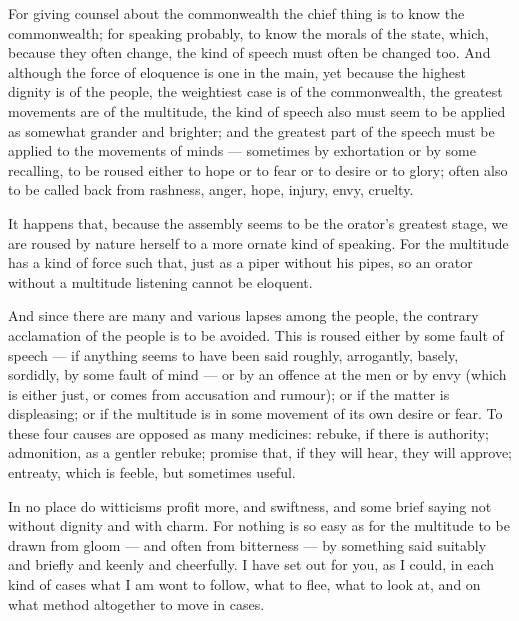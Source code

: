  For giving counsel about the commonwealth the chief thing is to know the commonwealth; for speaking probably, to know the morals of the state, which, because they often change, the kind of speech must often be changed too. And although the force of eloquence is one in the main, yet because the highest dignity is of the people, the weightiest case is of the commonwealth, the greatest movements are of the multitude, the kind of speech also must seem to be applied as somewhat grander and brighter; and the greatest part of the speech must be applied to the movements of minds — sometimes by exhortation or by some recalling, to be roused either to hope or to fear or to desire or to glory; often also to be called back from rashness, anger, hope, injury, envy, cruelty.

 It happens that, because the assembly seems to be the orator's greatest stage, we are roused by nature herself to a more ornate kind of speaking. For the multitude has a kind of force such that, just as a piper without his pipes, so an orator without a multitude listening cannot be eloquent.

 And since there are many and various lapses among the people, the contrary acclamation of the people is to be avoided. This is roused either by some fault of speech — if anything seems to have been said roughly, arrogantly, basely, sordidly, by some fault of mind — or by an offence at the men or by envy (which is either just, or comes from accusation and rumour); or if the matter is displeasing; or if the multitude is in some movement of its own desire or fear. To these four causes are opposed as many medicines: rebuke, if there is authority; admonition, as a gentler rebuke; promise that, if they will hear, they will approve; entreaty, which is feeble, but sometimes useful.

 In no place do witticisms profit more, and swiftness, and some brief saying not without dignity and with charm. For nothing is so easy as for the multitude to be drawn from gloom — and often from bitterness — by something said suitably and briefly and keenly and cheerfully. I have set out for you, as I could, in each kind of cases what I am wont to follow, what to flee, what to look at, and on what method altogether to move in cases.

